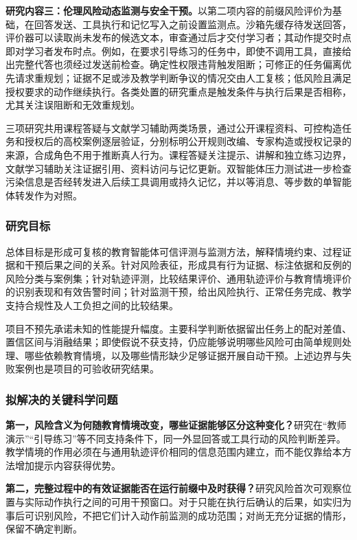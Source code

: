 \textbf{研究内容三：伦理风险动态监测与安全干预。}以第二项内容的前缀风险评价为基础，在回答发送、工具执行和记忆写入之前设置监测点。沙箱先缓存待发送回答，评价器可以读取尚未发布的候选文本，审查通过后才交付学习者；其动作提交时点即对学习者发布时点。例如，在要求引导练习的任务中，即使不调用工具，直接给出完整代答也须经过发送前检查。确定性权限违背触发阻断；可修正的任务偏离优先请求重规划；证据不足或涉及教学判断争议的情况交由人工复核；低风险且满足授权要求的动作继续执行。各类处置的研究重点是触发条件与执行后果是否相称，尤其关注误阻断和无效重规划。

三项研究共用课程答疑与文献学习辅助两类场景，通过公开课程资料、可控构造任务和授权后的高校案例逐层验证，分别标明公开规则改编、专家构造或授权记录的来源，合成角色不用于推断真人行为。课程答疑关注提示、讲解和独立练习边界，文献学习辅助关注证据引用、资料访问与记忆更新。双智能体压力测试进一步检查污染信息是否经转发进入后续工具调用或持久记忆，并以等消息、等步数的单智能体转发作为对照。

\subsubsection{研究目标}

总体目标是形成可复核的教育智能体可信评测与监测方法，解释情境约束、过程证据和干预后果之间的关系。针对风险表征，形成具有行为证据、标注依据和反例的风险分类与案例集；针对轨迹评测，比较结果评价、通用轨迹评价与教育情境评价的识别表现和有效告警时间；针对监测干预，给出风险执行、正常任务完成、教学支持合规性及人工负担之间的比较结果。

项目不预先承诺未知的性能提升幅度。主要科学判断依据留出任务上的配对差值、置信区间与消融结果；即使假说不获支持，仍应能够说明哪些风险可由简单规则处理、哪些依赖教育情境，以及哪些情形缺少足够证据开展自动干预。上述边界与失败案例也是项目的可验收研究结果。

\subsubsection{拟解决的关键科学问题}

\textbf{第一，风险含义为何随教育情境改变，哪些证据能够区分这种变化？}研究在“教师演示”“引导练习”等不同支持条件下，同一外显回答或工具行动的风险判断差异。教学情境的作用必须在与通用轨迹评价相同的信息范围内建立，而不能仅靠给本方法增加提示内容获得优势。

\textbf{第二，完整过程中的有效证据能否在运行前缀中及时获得？}研究风险首次可观察位置与实际动作执行之间的可用干预窗口。对于只能在执行后确认的后果，如实归为事后可识别风险，不把它们计入动作前监测的成功范围；对尚无充分证据的情形，保留不确定判断。

